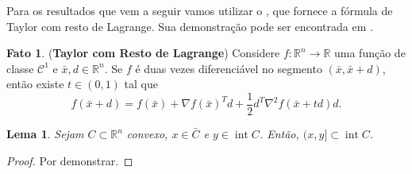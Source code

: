 \documentclass[12pt,a4paper]{scrartcl}
\DeclareMathOperator{\interior}{int}
\def\RR{\mathds{R}}
\def\xbar{\bar{x}}
\newtheorem{lema}{Lema}
\theoremstyle{definition}%
\newtheorem{fato}{Fato}
\begin{document}
Para os resultados que vem a seguir vamos utilizar o , que fornece a fórmula de Taylor com resto de Lagrange. Sua demonstração pode ser encontrada em \textcite[p.196]{Elon2019}.

\begin{fato}(\textbf{Taylor com Resto de Lagrange}) \label{fato:Taylor_com_resto_lagrange}
Considere $f: \RR^{n} \rightarrow \RR$ uma função de classe $\mathcal{C}^{1}$ e $\xbar, d \in \RR^{n}$. Se $f$ é duas vezes diferenciável no segmento $(\xbar , \xbar + d)$, então existe $t \in (0,1)$ tal que
\[
f(\xbar + d) = f(\xbar) + \nabla f(\xbar)^{T} d + \dfrac{1}{2}d^{T}\nabla^{2} f(\xbar + td)d .
\]
\end{fato}


\begin{lema} \label{lema:auxiliar_para_teo_hessiana_convexidade}
Sejam $C \subset \RR^{n}$ convexo, $x \in \bar{C}$ e $y \in \interior C$. Então, $(x,y] \subset \interior C$.
\end{lema}
\begin{proof}
Por demonstrar.
\end{proof}
\end{document}
